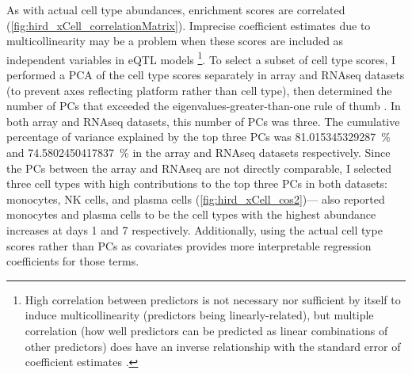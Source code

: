 As with actual cell type abundances,  enrichment scores are correlated (\cref{fig:hird_xCell_correlationMatrix}).
Imprecise coefficient estimates due to multicollinearity may be a problem when these scores are included as independent variables in \gls{eQTL} models%
\footnote{
    High correlation between predictors is not necessary nor sufficient by itself to induce multicollinearity (predictors being linearly-related), but multiple correlation (how well predictors can be predicted as linear combinations of other predictors) does have an inverse relationship with the standard error of coefficient estimates \autocite{maddala1992IntroductionEconometrics}.
}.
To select a subset of cell type scores, I performed a \gls{PCA} of the cell type scores separately in array and \gls{RNAseq} datasets (to prevent axes reflecting platform rather than cell type),
then determined the number of \glspl{PC} that exceeded the eigenvalues-greater-than-one rule of thumb \autocite{kanyongo2005InfluenceReliabilityFour}.
In both array and \gls{RNAseq} datasets, this number of \glspl{PC} was three.
The cumulative percentage of variance explained by the top three \glspl{PC} was \SI{81.015345329287}{\percent} and \SI{74.5802450417837}{\percent} in the array and \gls{RNAseq} datasets respectively.
Since the \glspl{PC} between the array and \gls{RNAseq} are not directly comparable,
I selected three cell types with high contributions to the top three \glspl{PC} in both datasets:
monocytes, \gls{NK} cells, and plasma cells (\cref{fig:hird_xCell_cos2})---%
\textcite{sobolev2016AdjuvantedInfluenzaH1N1Vaccination} also reported monocytes and plasma cells to be the cell types with the highest abundance increases at days 1 and 7 respectively.
Additionally, using the actual cell type scores rather than \glspl{PC} as covariates provides more interpretable regression coefficients for those terms.

